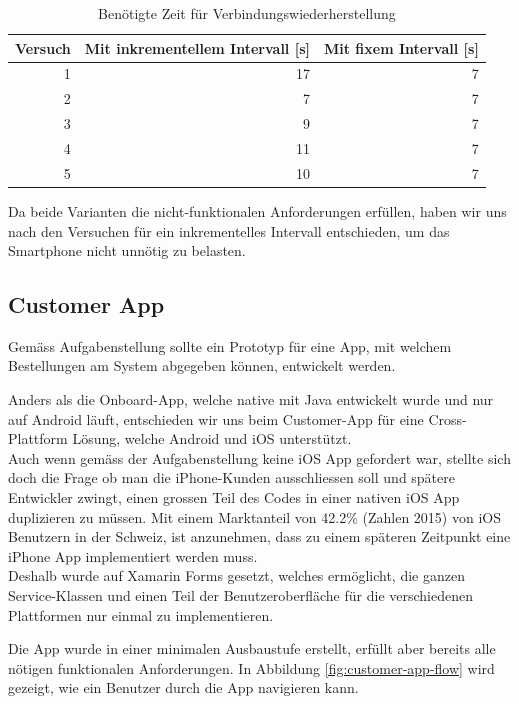 \begin{table}
	
	\centering
	\begin{tabular}{|r|r|r|}
		\hline
		\textbf{Versuch} & \textbf{Mit inkrementellem Intervall [s] } & \textbf{Mit fixem Intervall [s]} \\
		\hline
		1 & 17 & 7 \\
		2 &	7 & 7 \\
		3 & 9 & 7 \\
 		4 & 11 & 7 \\
		5 & 10 & 7 \\
		\hline
	\end{tabular}
	\caption{Benötigte Zeit für Verbindungswiederherstellung}
	\label{tbl:backoff}
\end{table}

Da beide Varianten die nicht-funktionalen Anforderungen erfüllen, haben wir uns nach den Versuchen für ein inkrementelles Intervall entschieden, um das Smartphone nicht unnötig zu belasten.

\subsection{Customer App}
Gemäss Aufgabenstellung sollte ein Prototyp für eine App, mit welchem Bestellungen am System abgegeben können, entwickelt werden.

Anders als die Onboard-App, welche native mit Java entwickelt wurde und nur auf Android läuft, entschieden wir uns beim Customer-App für eine Cross-Plattform Lösung, welche Android und iOS unterstützt. \\

Auch wenn gemäss der Aufgabenstellung keine iOS App gefordert war, stellte sich doch die Frage ob man die iPhone-Kunden ausschliessen soll und spätere Entwickler zwingt, einen grossen Teil des Codes in einer nativen iOS App duplizieren zu müssen. Mit einem Marktanteil von 42.2\% (Zahlen 2015) \cite{ios-user} von iOS Benutzern in der Schweiz, ist anzunehmen, dass zu einem späteren Zeitpunkt eine iPhone App implementiert werden muss.\\

Deshalb wurde auf Xamarin Forms gesetzt, welches ermöglicht, die ganzen Service-Klassen und einen Teil der Benutzeroberfläche für die verschiedenen Plattformen nur einmal zu implementieren.

Die App wurde in einer minimalen Ausbaustufe erstellt, erfüllt aber bereits alle nötigen funktionalen Anforderungen. In Abbildung \ref{fig:customer-app-flow} wird gezeigt, wie ein Benutzer durch die App navigieren kann. 

